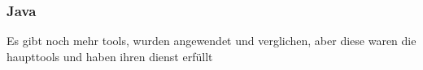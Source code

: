 \subsubsection{Java}\label{subsubsection:forensics-tools-java}





Es gibt noch mehr tools, wurden angewendet und verglichen, aber diese waren die haupttools und haben ihren dienst erfüllt
